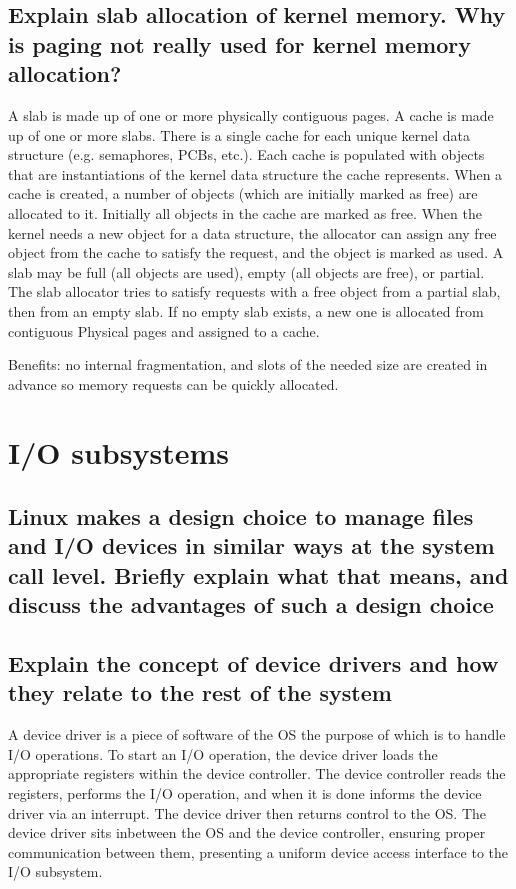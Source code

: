 \documentclass{article}
\begin{document}
\subsection{Explain slab allocation of kernel memory. Why is paging not really used for kernel memory allocation?}
A slab is made up of one or more physically contiguous pages. A cache is made up of one or more slabs. There is a single cache for each unique kernel data structure (e.g. semaphores, PCBs, etc.). Each cache is populated with objects that are instantiations of the kernel data structure the cache represents. When a cache is created, a number of objects (which are initially marked as free) are allocated to it. Initially all objects in the cache are marked as free. When the kernel needs a new object for a data structure, the allocator can assign any free object from the cache to satisfy the request, and the object is marked as used. A slab may be full (all objects are used), empty (all objects are free), or partial. The slab allocator tries to satisfy requests with a free object from a partial slab, then from an empty slab. If no empty slab exists, a new one is allocated from contiguous Physical pages and assigned to a cache.

Benefits: no internal fragmentation, and slots of the needed size are created in advance so memory requests can be quickly allocated.

\section{I/O subsystems}

\subsection{Linux makes a design choice to manage files and I/O devices in similar ways at the system call level. Briefly explain what that means, and discuss the advantages of such a design choice}

\subsection{Explain the concept of device drivers and how they relate to the rest of the system}
A device driver is a piece of software of the OS the purpose of which is to handle I/O operations. To start an I/O operation, the device driver loads the appropriate registers within the device controller. The device controller reads the registers, performs the I/O operation, and when it is done informs the device driver via an interrupt. The device driver then returns control to the OS. The device driver sits inbetween the OS and the device controller, ensuring proper communication between them, presenting a uniform device access interface to the I/O subsystem.
\end{document}
